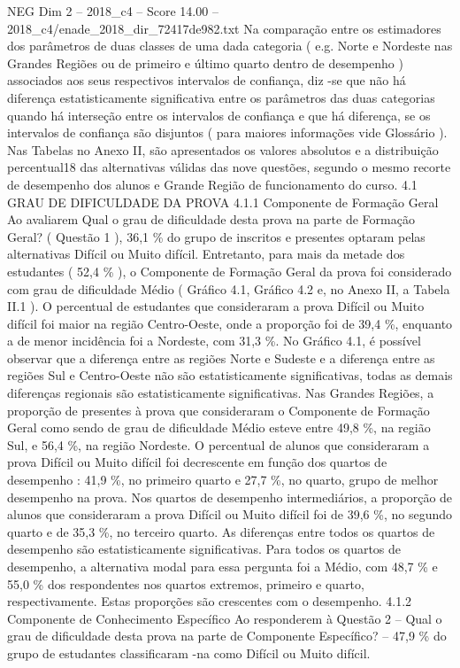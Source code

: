 \begin{textsample}{NEG Dim 2 – 2018\_c4 – Score 14.00 – 2018\_c4/enade\_2018\_dir\_72417de982.txt}
Na comparação entre os estimadores dos parâmetros de duas classes de uma dada categoria ( e.g.
Norte e Nordeste nas Grandes Regiões ou de primeiro e último quarto dentro de desempenho ) associados aos seus respectivos intervalos de confiança, diz -se que não há diferença estatisticamente significativa entre os parâmetros das duas categorias quando há interseção entre os intervalos de confiança e que há diferença, se os intervalos de confiança são disjuntos ( para maiores informações vide Glossário ).
Nas Tabelas no Anexo II, são apresentados os valores absolutos e a distribuição percentual18 das alternativas válidas das nove questões, segundo o mesmo recorte de desempenho dos alunos e Grande Região de funcionamento do curso. 4.1 GRAU DE DIFICULDADE DA PROVA 4.1.1 Componente de Formação Geral Ao avaliarem Qual o grau de dificuldade desta prova na parte de Formação Geral? ( Questão 1 ), 36,1 \% do grupo de inscritos e presentes optaram pelas alternativas Difícil ou Muito difícil.
Entretanto, para mais da metade dos estudantes ( 52,4 \% ), o Componente de Formação Geral da prova foi considerado com grau de dificuldade Médio ( Gráfico 4.1, Gráfico 4.2 e, no Anexo II, a Tabela II.1 ).
O percentual de estudantes que consideraram a prova Difícil ou Muito difícil foi maior na região Centro-Oeste, onde a proporção foi de 39,4 \%, enquanto a de menor incidência foi a Nordeste, com 31,3 \%.
No Gráfico 4.1, é possível observar que a diferença entre as regiões Norte e Sudeste e a diferença entre as regiões Sul e Centro-Oeste não são estatisticamente significativas, todas as demais diferenças regionais são estatisticamente significativas.
Nas Grandes Regiões, a proporção de presentes à prova que consideraram o Componente de Formação Geral como sendo de grau de dificuldade Médio esteve entre 49,8 \%, na região Sul, e 56,4 \%, na região Nordeste.
O percentual de alunos que consideraram a prova Difícil ou Muito difícil foi decrescente em função dos quartos de desempenho : 41,9 \%, no primeiro quarto e 27,7 \%, no quarto, grupo de melhor desempenho na prova.
Nos quartos de desempenho intermediários, a proporção de alunos que consideraram a prova Difícil ou Muito difícil foi de 39,6 \%, no segundo quarto e de 35,3 \%, no terceiro quarto.
As diferenças entre todos os quartos de desempenho são estatisticamente significativas.
Para todos os quartos de desempenho, a alternativa modal para essa pergunta foi a Médio, com 48,7 \% e 55,0 \% dos respondentes nos quartos extremos, primeiro e quarto, respectivamente.
Estas proporções são crescentes com o desempenho. 4.1.2 Componente de Conhecimento Específico Ao responderem à Questão 2 – Qual o grau de dificuldade desta prova na parte de Componente Específico? – 47,9 \% do grupo de estudantes classificaram -na como Difícil ou Muito difícil.

\end{textsample}
